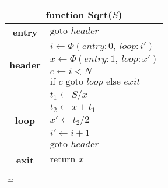 \centering
{}
\begin{minipage}{0.43\textwidth}
\begin{tabular}{|cl|}
\multicolumn{2}{c}{{\bf function} Sqrt($S$)}\\
\hline
{\bf entry} & $\text{goto } header$\\
\hline
\multirow{4}{*}{\bf header} & $i \leftarrow \Phi(entry:0,\ loop:i')$\\
                            & $x \leftarrow \Phi(entry:1,\ loop:x')$\\
                            & $c \leftarrow i<N$\\
                            & $\text{if }c\text{ goto }loop\text{ else }exit$\\
\hline
\multirow{5}{*}{\bf loop} & $t_1\leftarrow S/x$\\
                          & $t_2\leftarrow x+t_1$\\
                          & $x'\leftarrow t_2/2$\\
                          & $i'\leftarrow i+1$\\
                          & $\text{goto }header$\\
\hline
{\bf exit} & $\text{return }x$\\
\hline
\end{tabular}
\end{minipage}

\vspace{3.2mm}
{\huge
$\cong$}
\vspace{3.2mm}

